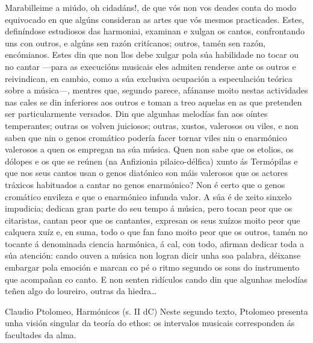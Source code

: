 Marabilleime a miúdo, oh cidadáns!, de que vós non vos deades conta do modo equivocado en que algúns consideran as artes que vós mesmos practicades. Estes, definíndose estudiosos das harmoniai, examinan e xulgan os cantos, confrontando uns con outros, e algúns sen razón critícanos; outros, tamén sen razón, encómianos. Estes din que non llos debe xulgar pola súa habilidade no tocar ou no cantar —para as execucións musicais eles admiten renderse ante os outros e reivindican, en cambio, como a súa exclusiva ocupación a especulación teórica sobre a música—, mentres que, segundo parece, afánanse moito nestas actividades nas cales se din inferiores aos outros e toman a treo aquelas en as que pretenden ser particularmente versados. Din que algunhas melodías fan aos oíntes temperantes; outras os volven juiciosos; outras, xustos, valerosos ou viles, e non saben que nin o genos cromático podería facer tornar viles nin o enarmónico valerosos a quen os empregan na súa música. Quen non sabe que os etolios, os dólopes e os que se reúnen (na Anfizionia pilaico-délfica) xunto ás Termópilas e que nos seus cantos usan o genos diatónico son máis valerosos que os actores tráxicos habituados a cantar no genos enarmónico? Non é certo que o genos cromático envileza e que o enarmónico infunda valor. A súa é de xeito sinxelo impudicia; dedican gran parte do seu tempo á música, pero tocan peor que os citaristas, cantan peor que os cantantes, expresan os seus xuízos moito peor que calquera xuíz e, en suma, todo o que fan fano moito peor que os outros, tamén no tocante á denominada ciencia harmónica, á cal, con todo, afirman dedicar toda a súa atención: cando ouven a música non logran dicir unha soa palabra, déixanse embargar pola emoción e marcan co pé o ritmo segundo os sons do instrumento que acompañan co canto. E non senten ridículos cando din que algunhas melodías teñen algo do loureiro, outras da hiedra…

Claudio Ptolomeo, Harmónicos (s. II dC)
Neste segundo texto, Ptolomeo presenta unha visión singular da teoría do ethos: os intervalos musicais corresponden ás facultades da alma.


